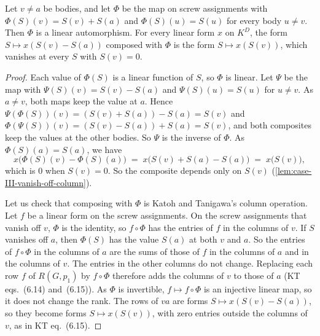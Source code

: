 \begin{lemma}
  \label{lem:case-III-columnop}
  \leanok
  Let $v \neq a$ be bodies, and let $\Phi$ be the map on screw
  assignments with $\Phi(S)(v) = S(v) + S(a)$ and $\Phi(S)(u) = S(u)$
  for every body $u \neq v$. Then $\Phi$ is a linear automorphism. For
  every linear form $x$ on $K^D$, the form $S \mapsto x(S(v) - S(a))$
  composed with $\Phi$ is the form $S \mapsto x(S(v))$, which vanishes
  at every $S$ with $S(v) = 0$.
\end{lemma}
\begin{proof}
  \leanok
  Each value of $\Phi(S)$ is a linear function of $S$, so $\Phi$ is
  linear. Let $\Psi$ be the map with $\Psi(S)(v) = S(v) - S(a)$ and
  $\Psi(S)(u) = S(u)$ for $u \neq v$. As $a \neq v$, both maps keep the
  value at $a$. Hence
  $\Psi(\Phi(S))(v) = (S(v) + S(a)) - S(a) = S(v)$ and
  $\Phi(\Psi(S))(v) = (S(v) - S(a)) + S(a) = S(v)$, and both composites
  keep the values at the other bodies. So $\Psi$ is the inverse of
  $\Phi$. As $\Phi(S)(a) = S(a)$, we have
  \[
    x\bigl(\Phi(S)(v) - \Phi(S)(a)\bigr)
    \;=\; x\bigl(S(v) + S(a) - S(a)\bigr) \;=\; x\bigl(S(v)\bigr),
  \]
  which is $0$ when $S(v) = 0$. So the composite depends only on $S(v)$
  (\cref{lem:case-III-vanish-off-column}).

  Let us check that composing with $\Phi$ is Katoh and Tanigawa's column
  operation. Let $f$ be a linear form on the screw assignments. On the
  screw assignments that vanish off $v$, $\Phi$ is the identity, so
  $f \circ \Phi$ has the entries of $f$ in the columns of $v$. If $S$
  vanishes off $a$, then $\Phi(S)$ has the value $S(a)$ at both $v$
  and $a$. So the entries of $f \circ \Phi$ in the columns of $a$ are
  the sums of those of $f$ in the columns of $a$ and in the columns of
  $v$. The entries in the other columns do not change. Replacing each
  row $f$ of $R(G, p_1)$ by $f \circ \Phi$ therefore adds the columns of
  $v$ to those of $a$ (KT eqs.~(6.14) and~(6.15)). As $\Phi$ is
  invertible, $f \mapsto f \circ \Phi$ is an injective linear map, so it
  does not change the rank. The rows of $va$ are forms
  $S \mapsto x(S(v) - S(a))$, so they become forms $S \mapsto x(S(v))$,
  with zero entries outside the columns of $v$, as in KT eq.~(6.15).
\end{proof}

